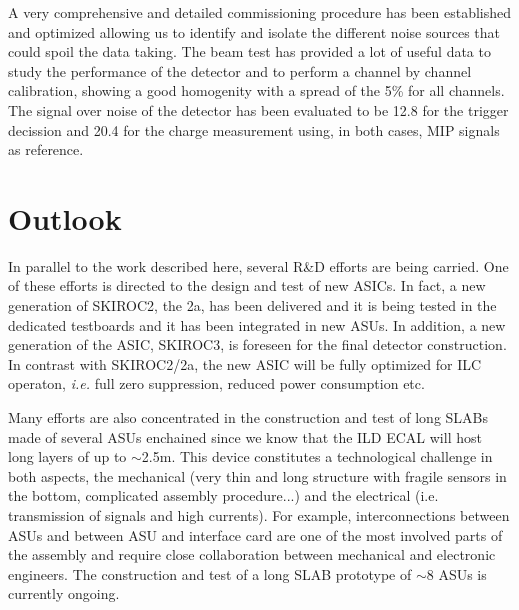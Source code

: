 \documentclass[a4paper,11pt]{article}
\begin{document}
A very comprehensive and detailed commissioning procedure has been established and optimized
allowing us to identify and isolate the different noise sources that could spoil the data taking.
The beam test has provided a lot of useful data to study 
the performance of the detector and to perform
a channel by channel calibration, showing a good homogenity with a spread of the 5\% for all channels.
The signal over noise of the detector has been evaluated to be 12.8 for the trigger
decission and 20.4 for the charge measurement using, in both cases, MIP signals as reference.

\section{Outlook}
\label{sec:outlook}

In parallel to the work described here, several R\&D efforts are being carried.
One of these efforts is directed to the design and test of new ASICs.
In fact, a new generation of SKIROC2, the 2a, has been delivered
and it is being tested in the dedicated testboards and it has been integrated in new ASUs.
In addition, a new generation of the ASIC, SKIROC3, is foreseen for the final detector construction.
In contrast with SKIROC2/2a, the new ASIC will be fully optimized for ILC operaton, {\it i.e.} full zero suppression, reduced power consumption etc.

Many efforts are also concentrated in the construction and test of long SLABs
made of several ASUs enchained since we know that the ILD ECAL will host long layers of up to $\sim$2.5m.
This device constitutes a technological challenge in both aspects, the mechanical
(very thin and long structure with fragile sensors in the bottom, complicated assembly procedure...)
and the electrical (i.e. transmission of signals and high currents).
For example, interconnections between ASUs and between ASU and interface card are one of
the most involved parts of the assembly
and require close collaboration between mechanical and electronic engineers.
The construction and test of a long SLAB prototype
of $\sim8$ ASUs is currently ongoing.
\end{document}
